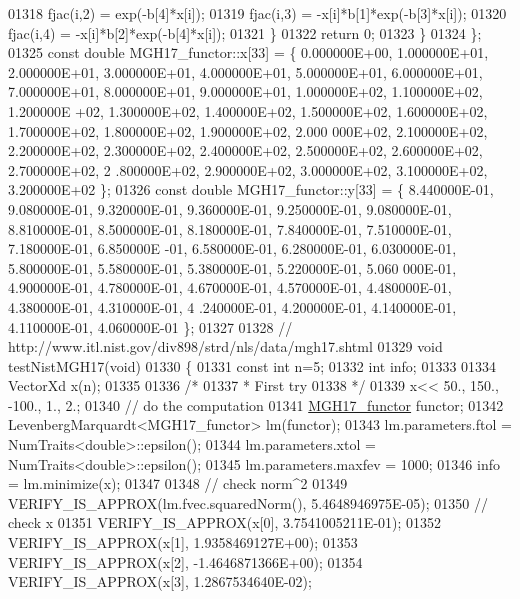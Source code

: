 \begin{DoxyCode}
01318             fjac(i,2) = exp(-b[4]*x[i]);
01319             fjac(i,3) = -x[i]*b[1]*exp(-b[3]*x[i]);
01320             fjac(i,4) = -x[i]*b[2]*exp(-b[4]*x[i]);
01321         \}
01322         \textcolor{keywordflow}{return} 0;
01323     \}
01324 \};
01325 \textcolor{keyword}{const} \textcolor{keywordtype}{double} MGH17\_functor::x[33] = \{ 0.000000E+00, 1.000000E+01, 2.000000E+01, 3.000000E+01, 4.000000E+01,
       5.000000E+01, 6.000000E+01, 7.000000E+01, 8.000000E+01, 9.000000E+01, 1.000000E+02, 1.100000E+02, 1.200000E
      +02, 1.300000E+02, 1.400000E+02, 1.500000E+02, 1.600000E+02, 1.700000E+02, 1.800000E+02, 1.900000E+02, 2.000
      000E+02, 2.100000E+02, 2.200000E+02, 2.300000E+02, 2.400000E+02, 2.500000E+02, 2.600000E+02, 2.700000E+02, 2
      .800000E+02, 2.900000E+02, 3.000000E+02, 3.100000E+02, 3.200000E+02 \};
01326 \textcolor{keyword}{const} \textcolor{keywordtype}{double} MGH17\_functor::y[33] = \{ 8.440000E-01, 9.080000E-01, 9.320000E-01, 9.360000E-01, 9.250000E-01,
       9.080000E-01, 8.810000E-01, 8.500000E-01, 8.180000E-01, 7.840000E-01, 7.510000E-01, 7.180000E-01, 6.850000E
      -01, 6.580000E-01, 6.280000E-01, 6.030000E-01, 5.800000E-01, 5.580000E-01, 5.380000E-01, 5.220000E-01, 5.060
      000E-01, 4.900000E-01, 4.780000E-01, 4.670000E-01, 4.570000E-01, 4.480000E-01, 4.380000E-01, 4.310000E-01, 4
      .240000E-01, 4.200000E-01, 4.140000E-01, 4.110000E-01, 4.060000E-01 \};
01327 
01328 \textcolor{comment}{// http://www.itl.nist.gov/div898/strd/nls/data/mgh17.shtml}
01329 \textcolor{keywordtype}{void} testNistMGH17(\textcolor{keywordtype}{void})
01330 \{
01331   \textcolor{keyword}{const} \textcolor{keywordtype}{int} n=5;
01332   \textcolor{keywordtype}{int} info;
01333 
01334   VectorXd x(n);
01335 
01336   \textcolor{comment}{/*}
01337 \textcolor{comment}{   * First try}
01338 \textcolor{comment}{   */}
01339   x<< 50., 150., -100., 1., 2.;
01340   \textcolor{comment}{// do the computation}
01341   \hyperlink{struct_m_g_h17__functor}{MGH17\_functor} functor;
01342   LevenbergMarquardt<MGH17\_functor> lm(functor);
01343   lm.parameters.ftol = NumTraits<double>::epsilon();
01344   lm.parameters.xtol = NumTraits<double>::epsilon();
01345   lm.parameters.maxfev = 1000;
01346   info = lm.minimize(x);
01347 
01348   \textcolor{comment}{// check norm^2}
01349   VERIFY\_IS\_APPROX(lm.fvec.squaredNorm(), 5.4648946975E-05);
01350   \textcolor{comment}{// check x}
01351   VERIFY\_IS\_APPROX(x[0], 3.7541005211E-01);
01352   VERIFY\_IS\_APPROX(x[1], 1.9358469127E+00);
01353   VERIFY\_IS\_APPROX(x[2], -1.4646871366E+00);
01354   VERIFY\_IS\_APPROX(x[3], 1.2867534640E-02);

\end{DoxyCode}
